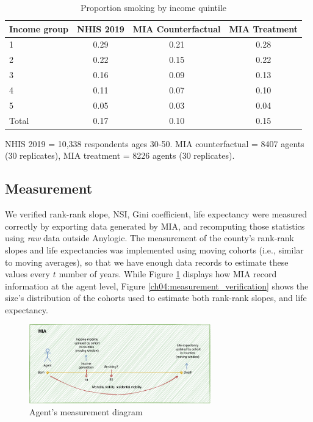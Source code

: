 \vspace{5mm}
\begin{table}[htp]
\setlength{\tabcolsep}{15pt}
\centering
\footnotesize
\caption{Proportion smoking by income quintile}
\label{ch04:tab_smoking_distribution}
\begin{threeparttable}
\begin{tabular}{lccc}
  \hline
Income group & NHIS 2019 & MIA Counterfactual & MIA Treatment \\
  \hline
  1 & 0.29 & 0.21 & 0.28 \\
  2 & 0.22 & 0.15 & 0.22 \\
  3 & 0.16 & 0.09 & 0.13 \\
  4 & 0.11 & 0.07 & 0.10 \\
  5 & 0.05 & 0.03 & 0.04 \\
  Total  & 0.17 & 0.10 & 0.15 \\
   \hline
\end{tabular}
\begin{tablenotes}
\footnotesize
\item NHIS 2019 = 10,338 respondents ages 30-50. MIA counterfactual = 8407 agents (30 replicates), MIA treatment = 8226 agents (30 replicates).
\end{tablenotes}
\end{threeparttable}
\end{table}
\vspace{5mm}


\subsection{Measurement}

We verified rank-rank slope, NSI, Gini coefficient, life expectancy were measured correctly by exporting data generated by MIA, and recomputing those statistics using \textit{raw} data outside Anylogic. The measurement of the county's rank-rank slopes and life expectancies was implemented using moving cohorts (i.e., similar to moving averages), so that we have enough data records to estimate these values every $t$ number of years. While Figure \ref{ch04:measurement_diagram} displays how MIA record information at the agent level, Figure \ref{ch04:measurement_verification} shows the size's distribution of the cohorts used to estimate both rank-rank slopes, and life expectancy. 

\newpage
\begin{figure}
    \centering
    \caption{Agent's measurement diagram}
    \label{ch04:measurement_diagram}
    \includegraphics[width=0.7\textwidth]{plots/measurement-diagram.pdf}
\end{figure}

\vspace{5mm}


\clearpage

\onlyifstandalone{
\singlespacing
\setlength\bibitemsep{5pt}
\printbibliography[title={References}]
\end{refsection}
}

